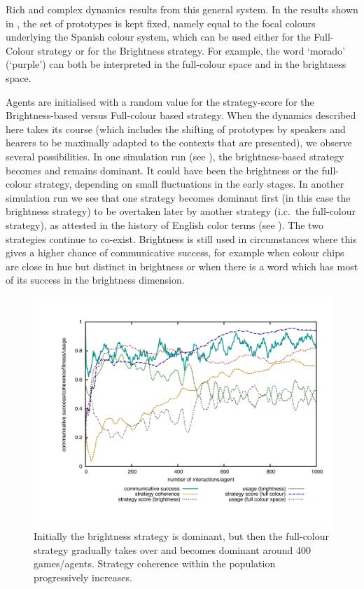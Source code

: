 Rich and complex dynamics results from this general system. In the results shown in , the 
set of prototypes is kept fixed, namely equal to the focal colours underlying 
the Spanish colour system, which can be used either for the Full-Colour strategy or for the Brightness strategy. 
For example, the word `morado' (`purple') can both be interpreted in the full-colour space and in the brightness space. 

Agents are initialised with a random value for the strategy-score for the Brightness-based versus
Full-colour based strategy. When the dynamics described here takes its 
course (which includes the shifting of prototypes by speakers and hearers to be maximally adapted to the 
contexts that are presented), we observe several possibilities. In one simulation run (see ), 
the brightness-based strategy becomes and remains dominant. It could have been the brightness 
or the full-colour strategy, depending on small fluctuations in the early stages. 
In another simulation run we see that one strategy becomes dominant first (in this case the brightness strategy) 
to be overtaken later by another strategy (i.c.\ the full-colour strategy), 
as attested in the history of English color terms (see ). 
The two strategies continue to co-exist. Brightness is still used in 
circumstances where this gives a higher chance of communicative success, for example when colour chips are 
close in hue but distinct in brightness or when there is a word which has most of its success in the brightness 
dimension. 


\begin{figure}[b]
\centerline{\includegraphics[width=.9\textwidth]{chap12/figs/strategies-competition.pdf}}
\caption{{Initially the brightness strategy is dominant, but then the full-colour 
strategy gradually takes over and becomes dominant around 400 games/agents. Strategy coherence within the population
progressively increases.}
\label{fig:strategies-dynamics}}
\end{figure}


